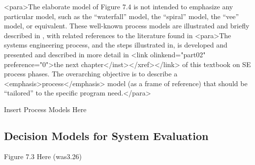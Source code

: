<para>The elaborate model of Figure 7.4 is not intended to emphasize any particular model, such as the “waterfall” model, the “spiral” model, the “vee” model, or equivalent. These well-known process models are illustrated and briefly described in , with related references to the literature found in 
	<para>The systems engineering process, and the steps illustrated in, is developed and presented and described in more detail in <link olinkend="part02" preference="0">the next chapter</inst></xref></link> of this textbook on SE process phases. The overarching objective is to describe a <emphasis>process</emphasis> model (as a frame of reference) that should be “tailored” to the specific program need.</para>

Insert Process Models Here

\subsection{Decision Models for System Evaluation}

Figure 7.3 Here (was3.26)

